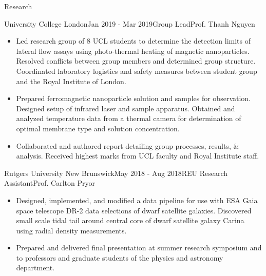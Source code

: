 \documentclass{resume} %
\begin{document}
\begin{rSection}{Research}
\begin{rSubsection}{University College London}{Jan 2019 - Mar 2019}{Group Lead}{Prof. Thanh Nguyen}
\begin{itemize}
\item Led research group of 8 UCL students to determine the detection limits of lateral flow assays using photo-thermal heating of magnetic nanoparticles. Resolved conflicts between group members and determined group structure. Coordinated laboratory logistics and safety measures between student group and the Royal Institute of London.
\item Prepared ferromagnetic nanoparticle solution and samples for observation. Designed setup of infrared laser and sample apparatus. Obtained and analyzed temperature data from a thermal camera for determination of optimal membrane type and solution concentration.
\item Collaborated and authored report detailing group processes, results, \& analysis. Received highest marks from UCL faculty and Royal Institute staff.
\end{itemize}
\end{rSubsection}

\begin{rSubsection}{Rutgers University New Brunswick}{May 2018 - Aug 2018}{REU Research Assistant}{Prof. Carlton Pryor}
\begin{itemize}
\item Designed, implemented, and modified a data pipeline for use with ESA Gaia space telescope DR-2 data selections of dwarf satellite galaxies. Discovered small scale tidal tail around central core of dwarf satellite galaxy Carina using radial density measurements.
\item Prepared and delivered final presentation at summer research symposium and to professors and graduate students of the physics and astronomy department.
\end{itemize}
\end{rSubsection}


\end{rSection}
\end{document}
